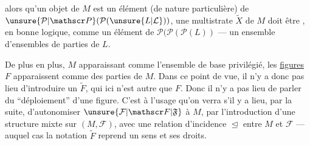 alors qu'un objet  de $M$ est un  élément (de nature particulière) de $\unsure{\mathcal P|\mathscr P}(\mathcal P(\unsure{L|\mathcal L}))$, une multistrate $\widetilde X$ de $M$ doit être , en bonne logique, comme un élément de $\mathcal P(\mathcal P(\mathcal P(L))$ --- un ensemble d'ensembles de parties de $L$.

De plus en plus, $M$ apparaissant comme l'ensemble de base privilégié, les \uline{figures} $F$ apparaissent comme des parties de $M$. Dans ce point de vue, il n'y a donc pas lieu d'introduire un $\widetilde F$, qui ici n'est autre que $F$. Donc il n'y a pas lieu de parler du ``déploiement'' d'une figure. C'est à l'usage qu'on verra s'il y a lieu, par la suite, d'autonomiser $\unsure{\mathcal F|\mathscr F|\mathfrak F}$  à $M$, par l'introduction d'une structure mixte sur $(M,\mathcal F)$, avec une relation d'incidence $\trianglelefteq$ entre $M$ et $\mathcal F$ --- auquel cas la notation $\widetilde F$ reprend un sens et ses droits.
